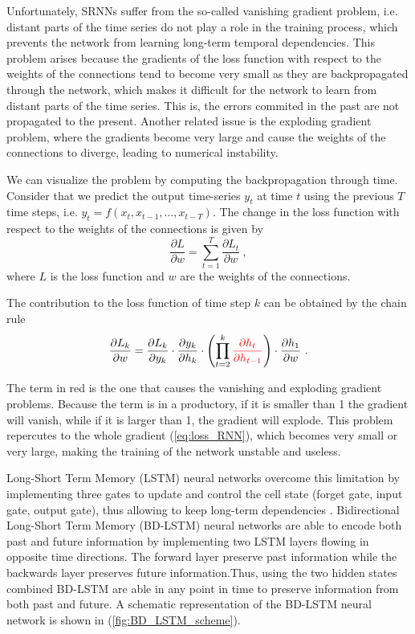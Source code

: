 Unfortunately, SRNNs suffer from the so-called vanishing gradient problem, i.e.
distant parts of the time series do not play a role in the training process,
which prevents the network from learning long-term temporal dependencies. This
problem arises because the gradients of the loss function with respect to the
weights of the connections tend to become very small as they are backpropagated
through the network, which makes it difficult for the network to learn from
distant parts of the time series. This is, the errors commited in the past are
not propagated to the present. Another related issue is the exploding gradient
problem, where the gradients become very large and cause the weights of the
connections to diverge, leading to numerical instability.

We can visualize the problem by computing the backpropagation through time.
Consider that we predict the output time-series $y_t$ at time $t$ using the
previous $T$ time steps, i.e. $y_t = f(x_t, x_{t-1}, \ldots, x_{t-T})$. The
change in the loss function with respect to the weights of the connections is
given by
\begin{equation}\label{eq:loss_RNN}
  \frac{\partial L}{\partial w} = \sum_{t=1}^{T} \frac{\partial L_t}{\partial
    w} \ ,
\end{equation}
where $L$ is the loss function and $w$ are the weights of the connections.

The contribution to the loss function of time step $k$ can be obtained by the
chain rule
\begin{equation}
  \frac{\partial L_k}{\partial w} = \frac{\partial L_k}{\partial
    y_k}\cdot\frac{\partial y_k}{\partial
    h_k}\cdot\left(\prod_{t=2}^k\textcolor{red}{\frac{\partial
      h_t}{\partial h_{t-1}}}\right)\cdot\frac{\partial h_1}{\partial w} \ .
\end{equation}

The term in red is the one that causes the vanishing and exploding gradient
problems. Because the term is in a productory, if it is smaller than 1 the
gradient will vanish, while if it is larger than 1, the gradient will explode.
This problem repercutes to the whole gradient (\cref{eq:loss_RNN}), which
becomes very small or very large, making the training of the network unstable
and useless.

Long-Short Term Memory (LSTM) neural networks overcome this limitation by
implementing three gates to update and control the cell state (forget gate,
input gate, output gate), thus allowing to keep long-term dependencies
\cite{LSTM_NN}. Bidirectional Long-Short Term Memory (BD-LSTM) neural networks
are able to encode both past and future information by implementing two LSTM
layers flowing in opposite time directions. The forward layer preserve past
information while the backwards layer preserves future information.Thus, using
the two hidden states combined BD-LSTM are able in any point in time to
preserve information from both past and future. A schematic representation of
the BD-LSTM neural network is shown in (\cref{fig:BD_LSTM_scheme}).

